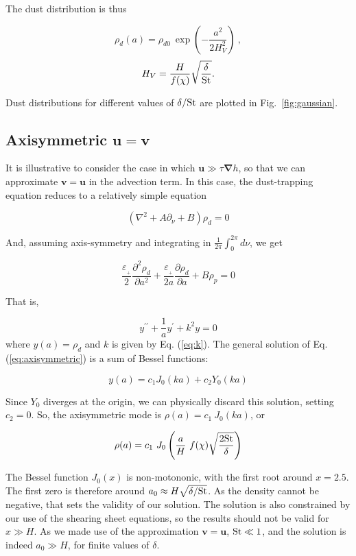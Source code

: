 \documentclass[apj]{emulateapj}
\newcommand{\pderiv}[2]{\frac{\partial #1}{\partial #2}}
\newcommand{\pderivn}[3]{\frac{\partial^{#3} #1}{\partial #2^{#3}}}
\renewcommand{\v}[1]{{\boldsymbol{#1}}} %
\newcommand{\del}{\v{\nabla}}
\newcommand{\grad}{\del}
\newcommand{\Laplace}{\nabla^2}
\newcommand{\Eq}[1]{Eq. (\ref{#1})}
\newcommand{\eq}[1]{\Eq{#1}}
\newcommand{\Fig}[1]{Fig.~\ref{#1}}
\newcommand{\fig}[1]{\Fig{#1}}
\newcommand{\beq}{\begin{equation}}
\newcommand{\eeq}{\end{equation}}
\newcommand{\epsp}{\varepsilon_{_{+}}}
\begin{document}
The dust distribution is thus 

\beq\label{eq:gen_axi}
\rho_d(a) = \rho_{d0} \ \exp\left(-\frac{a^2}{2H_V^2}\right) \ ,
\eeq
\beq
 H_V = \frac{H}{f(\chi)} \sqrt{\frac{\delta}{\rm St}}. 
\eeq

Dust distributions for different values of
$\delta/{\rm St}$ are plotted in \fig{fig:gaussian}.




\subsection{Axisymmetric $\v{u} = \v{v}$ }

It is illustrative to consider the case in which $\v{u} \gg \tau\grad{h}$,
so that we can approximate $\v{v}=\v{u}$ in the advection term. In
this case, the dust-trapping equation reduces to a relatively simple equation

\beq
\left(\Laplace{} + A\partial_\nu + B \right)\rho_d = 0 
\eeq

And, assuming axis-symmetry and integrating in $\frac{1}{2\pi} \int_0^{2\pi} d\nu$, we get 

\beq
\frac{\epsp}{2}\pderivn{\rho_d}{a}{2} +
\frac{\epsp}{2a}\pderiv{\rho_d}{a} + B \rho_p = 0  
\eeq

That is, 

\beq
y^{\prime\prime} + \frac{1}{a}y^\prime + k^2 y = 0 
\label{eq:axisymmetric}
\eeq where $y(a) = \rho_d$ and $k$ is given by \eq{eq:k}.  The general solution of \eq{eq:axisymmetric} is a
sum of Bessel functions: 

\beq
y(a) = c_1 J_0 (ka) + c_2 Y_0(ka) 
\eeq

Since  $Y_0$ diverges at the origin, we can physically discard 
this solution, setting $c_2=0$. So, the axisymmetric mode is $\rho(a)
= c_1 \ J_0 (ka)$, or

\beq
\rho(a) = c_1 \ J_0 \left(\frac{a}{H} \ f(\chi) \sqrt{\frac{2{\rm St}}{\delta}}\right)
\eeq 

The Bessel function $J_0(x)$ is
non-motononic, with the first root around $x=2.5$. The first zero is therefore around
$a_0 \approx H \sqrt{\delta/{\rm St}}$.  As the density
cannot be negative, that sets the validity of our solution. 
The solution is also constrained by our use of the shearing sheet
equations, so the results should not be valid for $x \gg H$.
As we made use of the approximation $\v{v}=\v{u}$, ${\rm St} \ll 1$,
and the solution  is indeed $a_0 \gg H$, for finite values of $\delta$.
\end{document}

